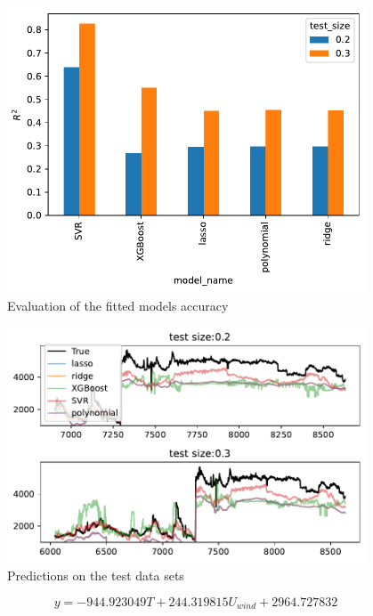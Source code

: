 \begin{figure}[H]
\begin{center}\includegraphics[width = 0.95\textwidth]{figures/test_evaluation.pdf}\end{center}
\vspace{-0.7cm}
\caption{Evaluation of the fitted models accuracy}
\label{fig:test_evaluation}
\end{figure}
\begin{figure}[H]
\begin{center}\includegraphics[width = 0.95\textwidth]{figures/predictions.pdf}\end{center}
\vspace{-0.7cm}
\caption{Predictions on the test data sets}
\label{fig:predictions}
\end{figure}
\begin{equation}
y = - 944.923049 T + 244.319815 U_{wind} + 2964.727832
\label{eq:model_polynomial}
\end{equation}

